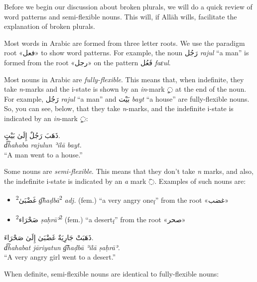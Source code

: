 \documentclass[
  10pt,
]{book}
\providecommand{\tightlist}{%
  \setlength{\itemsep}{0pt}\setlength{\parskip}{0pt}}
\begin{document}
Before we begin our discussion about broken plurals, we will do a quick review of word patterns and semi-flexible nouns. This will, if Allāh wills, facilitate the explanation of broken plurals.

Most words in Arabic are formed from three letter roots. We use the paradigm root \foreignlanguage{arabic}{«فعل»} to show word patterns. For example, the noun \foreignlanguage{arabic}{رَجُل} \emph{rajul} \enquote{a man} is formed from the root \foreignlanguage{arabic}{«رجل»} on the pattern \foreignlanguage{arabic}{فَعُل} \emph{faɛul}.

Most nouns in Arabic are \emph{fully-flexible}. This means that, when indefinite, they take \emph{n}-marks and the i-state is shown by an \emph{in}-mark \foreignlanguage{arabic}{◌ٍ} at the end of the noun. For example, \foreignlanguage{arabic}{رَجُل} \emph{rajul} \enquote{a man} and \foreignlanguage{arabic}{بَيْت} \emph{bayt} \enquote{a house} are fully-flexible nouns. So, you can see, below, that they take \emph{n}-marks, and the indefinite i-state is indicated by an \emph{in}-mark \foreignlanguage{arabic}{◌ٍ}:

\foreignlanguage{arabic}{ذَهَبَ رَجُلٌ إِلَىٰ بَيْتٍ.}\\
\emph{d͡hahaba rajulun ʾilā bayt.}\\
\enquote{A man went to a house.}

Some nouns are \emph{semi-flexible}. This means that they don't take \emph{n} marks, and also, the indefinite i-state is indicated by an \emph{a} mark \foreignlanguage{arabic}{◌َ}. Examples of such nouns are:

\begin{itemize}
\tightlist
\item
  \textsuperscript{2}\foreignlanguage{arabic}{غَضْبَىٰ} \emph{g͡haḍbā}\textsuperscript{2} \emph{adj.} (fem.) \enquote{a very angry one\textsubscript{f}} from the root \foreignlanguage{arabic}{«غضب»}
\item
  \textsuperscript{2}\foreignlanguage{arabic}{صَحْرَاء} \emph{ṣaḥrāʾ}\textsuperscript{2} (fem.) \enquote{a desert\textsubscript{f}} from the root \foreignlanguage{arabic}{«صحر»}
\end{itemize}

\foreignlanguage{arabic}{ذَهَبَتْ جَارِيَةٌ غَضْبَىٰ إِلَىٰ صَحْرَاءَ.}\\
\emph{d͡hahabat jāriyatun g͡haḍbā ʾilā ṣaḥrāʾ.}\\
\enquote{A very angry girl went to a desert.}

When definite, semi-flexible nouns are identical to fully-flexible nouns:
\end{document}
